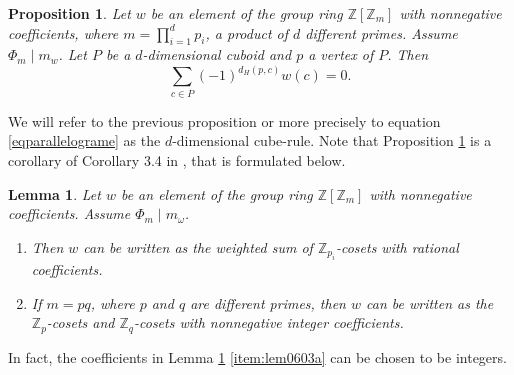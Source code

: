 \documentclass[10pt]{article}
\newcommand{\Z}{\mathbb{Z}}
\newtheorem{prop}[Thme]{Proposition}
\newtheorem{lem}[Thme]{Lemma}
\begin{document}
        \begin{prop}\label{prophypercube}
        Let $w$ be an element of the group ring $\Z[\Z_m]$ with nonnegative coefficients, where 
        $m=\prod_{i=1}^d p_i$, a product of $d$ different primes. Assume $\Phi_m \mid m_w$. Let $P$ be a $d$-dimensional
        cuboid and $p$ a vertex of $P$. Then
        \begin{equation}\label{eqparallelograme}
        \sum_{c \in P} (-1)^{d_H(p,c)}w(c)=0.
        \end{equation}
        \end{prop}
        We will refer to the previous proposition or more precisely to equation \eqref{eqparallelograme} as the $d$-dimensional cube-rule. Note that Proposition \ref{prophypercube} is a corollary of Corollary 3.4 in \cite{negyen}, that is formulated below. 
        \begin{lem}\label{lem0603}
        Let $w$ be an element of the group ring $\Z[\Z_m]$ with nonnegative coefficients. Assume $\Phi_m \mid m_{\omega}$.
        \begin{enumerate}
        \item\label{item:lem0603a} Then $w$ can be written as the weighted sum of $\Z_{p_i}$-cosets with rational coefficients. 
        \item If $m=pq$, where $p$ and $q$ are different primes, then $w$ can be written as the $\Z_p$-cosets and $\Z_q$-cosets with nonnegative integer coefficients.
        \end{enumerate}
        \end{lem}
        In fact, the coefficients in Lemma \ref{lem0603} \ref{item:lem0603a} can be chosen to be integers. 
        
\end{document}
